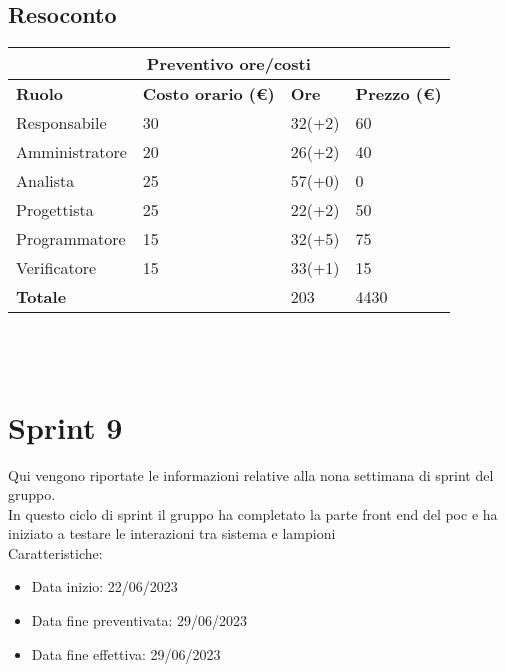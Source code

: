 \documentclass[12pt]{article}
\begin{document}
\subsection{Resoconto}
\begin{center}
    \begin{tabularx}{\textwidth}{|X|X|X|X|}
        \hline
        \multicolumn{4}{|c|}{\textbf{Preventivo ore/costi}}\\
        \hline
        \hline
        \textbf{Ruolo} & \textbf{Costo orario (\euro)} & \textbf{Ore} & \textbf{Prezzo (\euro)}\\
        \hline
        Responsabile    & 30 & 32(+2)  & 60\\
        \hline
        Amministratore  & 20 & 26(+2)  & 40\\
        \hline
        Analista        & 25 & 57(+0)  & 0\\
        \hline
        Progettista     & 25 & 22(+2)  & 50\\
        \hline
        Programmatore   & 15 & 32(+5)  & 75\\
        \hline
        Verificatore    & 15 & 33(+1)  & 15\\
        \hline
        \hline
        \textbf{Totale} &    & 203 &  4430 \\
        \hline
    \end{tabularx}\\[8pt]
    \mbox{}\\
\end{center}


\section{Sprint 9}
Qui vengono riportate le informazioni relative alla nona settimana di sprint del gruppo. \\
In questo ciclo di sprint il gruppo ha completato la parte front end del poc e ha iniziato a testare le interazioni tra sistema e lampioni \\


Caratteristiche:

\begin{itemize}
    \item Data inizio: 22/06/2023
    \item Data fine preventivata: 29/06/2023
    \item Data fine effettiva: 29/06/2023
\end{itemize}
\end{document}
